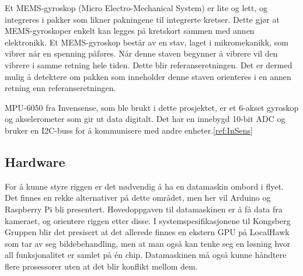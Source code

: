 Et MEMS-gyroskop (Micro Electro-Mechanical System) er lite og lett, og integreres i pakker som likner pakningene til integrerte kretser. Dette gjør at MEMS-gyroskoper enkelt kan legges på kretskort sammen med annen elektronikk. Et MEMS-gyroskop består av en stav, laget i mikromekanikk, som vibrer når en spenning påføres. Når denne staven begynner å vibrere vil den vibrere i samme retning hele tiden. Dette blir referanseretningen. Det er dermed mulig å detektere om pakken som inneholder denne staven orienteres i en annen retning enn referanseretningen.

MPU-6050 fra Invensense, som ble brukt i dette prosjektet, er et 6-akset gyroskop og akselerometer som gir ut data digitalt. Det har en innebygd 10-bit ADC og bruker en I2C-buss for å kommunisere med andre enheter.\ref{ref:InSens}

\subsection{Hardware}
For å kunne styre riggen er det nødvendig å ha en datamaskin ombord i flyet. Det finnes en rekke alternativer på dette området, men her vil Arduino og Raspberry Pi bli presentert. Hovedoppgaven til datamaskinen er å få data fra kameraet, og orientere riggen etter disse. I systemspesifikasjonene til Kongsberg Gruppen blir det presisert at det allerede finnes en ekstern GPU på LocalHawk som tar av seg bildebehandling, men at man også kan tenke seg en løsning hvor all funksjonalitet er samlet på én chip. Datamaskinen må også kunne håndtere flere prosessorer uten at det blir konflikt mellom dem.

